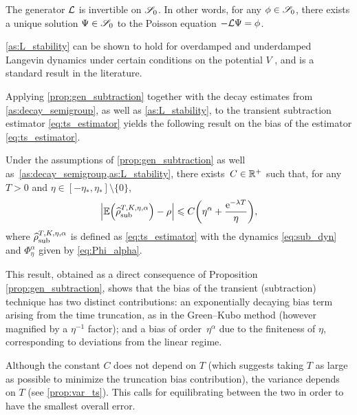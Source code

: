 \begin{assumption}
\label{as:L_stability}
%
The generator $\L$ is invertible on $\S_0$. In other words, for any $\phi\in\S_0$, there exists a unique solution $\Psi \in \S_0$ to the Poisson equation $-\L\Psi = \phi$.
\end{assumption}

\cref{as:L_stability} can be shown to hold for overdamped and underdamped Langevin dynamics under certain conditions on the potential $V$ \cite{talay2002,kopec2014,kopec2015}, and is a standard result in the literature.

Applying \cref{prop:gen_subtraction} together with the decay estimates from \cref{as:decay_semigroup}, as well as \cref{as:L_stability}, to the transient subtraction estimator \eqref{eq:ts_estimator} yields the following result on the bias of the estimator \eqref{eq:ts_estimator}.

\begin{corollary}
\label{cor:gk_equiv}
Under the assumptions of \cref{prop:gen_subtraction} as well as~\cref{as:decay_semigroup,as:L_stability}, there exists~$C\in\R^+$ such that, for any $T>0$ and $\eta \in [-\eta_*, \eta_*] \setminus \{0\}$,
\begin{equation}
	\left|\E\paren*{\aTSest} - \rho\right| \leq C\paren*{\eta^\alpha + \frac{\e^{-\lambda T}}{\eta}},
\label{eq:gk_cor_statement}
\end{equation}
%
where $\aTSest$ is defined as \eqref{eq:ts_estimator} with the dynamics \eqref{eq:sub_dyn} and $\Phi_\eta^\alpha$ given by \eqref{eq:Phi_alpha}.
%
\end{corollary}

This result, obtained as a direct consequence of Proposition \ref{prop:gen_subtraction}, shows that the bias of the transient (subtraction) technique has two distinct contributions: an exponentially decaying bias term arising from the time truncation, as in the Green--Kubo method (however magnified by a $\eta^{-1}$ factor); and a bias of order~$\eta^\alpha$ due to the finiteness of $\eta$, corresponding to deviations from the linear regime.

%
%
\begin{remark}
	Although the constant $C$ does not depend on $T$ (which suggests taking $T$ as large as possible to minimize the truncation bias contribution), the variance depends on $T$ (see \cref{prop:var_ts}). This calls for equilibrating between the two in order to have the smallest overall error.
\end{remark}

